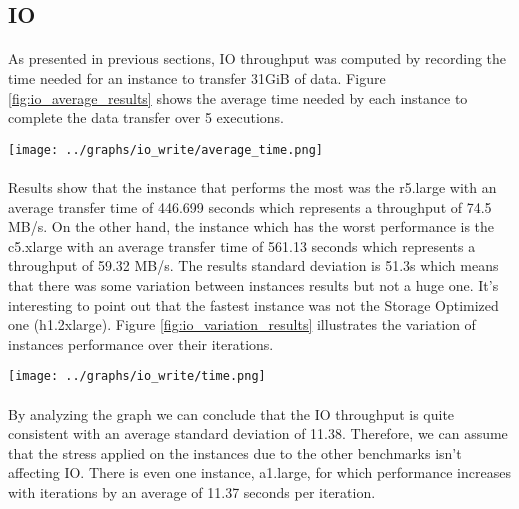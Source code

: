 \documentclass[11pt]{article}
\begin{document}
	\subsection{IO}
		\paragraph{} As presented in previous sections, IO throughput was
		computed by recording the time needed for an instance to transfer
		31GiB of data. Figure \ref{fig:io_average_results} shows the average time needed by each
		instance to complete the data transfer over 5 executions.

		\begin{center}
		\begin{minipage}{0.6\textwidth}
			 \label{fig:io_average_results}
			\texttt{[image: ../graphs/io\_write/average\_time.png]}
		\end{minipage}
		\end{center}

		\paragraph{} Results show that the instance that performs the most was the
		r5.large with an average transfer time of 446.699 seconds which
		represents a throughput of  74.5 MB/s. On the other hand, the instance
		which has the worst performance is the c5.xlarge with an average transfer
		time of 561.13 seconds which represents a throughput of 59.32 MB/s. The
		results standard deviation is 51.3s which means that there was some
		variation between instances results but not a huge one.  It’s
		interesting to point out that the fastest instance was not the Storage
		Optimized one (h1.2xlarge). Figure \ref{fig:io_variation_results} illustrates the variation of instances
		performance over their iterations.

		\begin{center}
		\begin{minipage}{0.6\textwidth}
			 \label{fig:io_variation_results}
			\texttt{[image: ../graphs/io\_write/time.png]}
		\end{minipage}
		\end{center}

		\paragraph{} By analyzing the graph we can conclude that the IO
		throughput is quite consistent with an average standard deviation of
		11.38. Therefore, we can assume that the stress applied on the instances
		due to the other benchmarks isn’t affecting IO.  There is even one
		instance, a1.large, for which performance increases with iterations by
		an average of 11.37 seconds per iteration.
\end{document}

